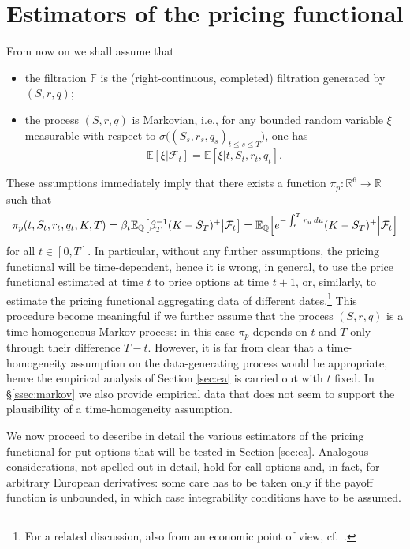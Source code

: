 \documentclass[11pt]{article}
\theoremstyle{remark}
\newcommand{\E}{\mathbb{E}}
\newcommand{\cF}{\mathcal{F}}
\newcommand{\Q}{\mathbb{Q}}
\newcommand{\erre}{\mathbb{R}}
\begin{document}
\section{Estimators of the pricing functional}
\label{sec:estim}
%
From now on we shall assume that
\begin{itemize}
\item[(a)] the filtration $\mathbb{F}$ is the (right-continuous,
  completed) filtration generated by $(S,r,q)$;
\item[(b)] the process $(S,r,q)$ is Markovian, i.e., for any
  bounded random variable $\xi$ measurable with respect to
  $\sigma\bigl( (S_s,r_s,q_s)_{t \leq s \leq T}\bigr)$, one has
  \[
  \E[\xi \vert \cF_t] = \E[\xi \vert t,S_t,r_t,q_t].
  \]
\end{itemize}
%
These assumptions immediately imply that there exists a function
$\pi_p:\erre^6 \to \erre$ such that
\[
\pi_p(t,S_t,r_t,q_t,K,T) = 
\beta_t \E_{\Q}\bigl[ \beta^{-1}_T (K-S_T)^+ \big\vert \cF_t
\bigr]
= \E_\Q\Bigl[ e^{-\int_t^T r_u\,du} (K-S_T)^+ \Big\vert \cF_t \Bigr]
\]
for all $t \in [0,T]$. In particular, without any further assumptions,
the pricing functional will be time-dependent, hence it is wrong, in
general, to use the price functional estimated at time $t$ to price
options at time $t+1$, or, similarly, to estimate the pricing
functional aggregating data of different dates.\footnote{For a related
  discussion, also from an economic point of view,
  cf.~\cite{RosenbergEngle:02}.} This procedure become meaningful if
we further assume that the process $(S,r,q)$ is a time-homogeneous
Markov process: in this case $\pi_p$ depends on $t$ and $T$ only
through their difference $T-t$. However, it is far from clear that a
time-homogeneity assumption on the data-generating process would be
appropriate, hence the empirical analysis of Section \ref{sec:ea} is
carried out with $t$ fixed. In \S\ref{ssec:markov} we also provide
empirical data that does not seem to support the plausibility of a
time-homogeneity assumption.

\medskip

We now proceed to describe in detail the various estimators of the
pricing functional for put options that will be tested in Section
\ref{sec:ea}. Analogous considerations, not spelled out in detail,
hold for call options and, in fact, for arbitrary European
derivatives: some care has to be taken only if the payoff function is
unbounded, in which case integrability conditions have to be assumed.
\end{document}
